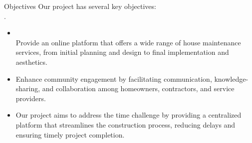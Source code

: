 \documentclass{beamer} %
\begin{document}
\begin{frame}{Objectives}
    Our project has several key objectives:\\.
     \begin{minipage}{1\textwidth}
            \begin{itemize}
                \item \\Provide an online platform that offers a wide range of house maintenance services, from initial planning and design to final implementation and aesthetics.

                

                \item Enhance community engagement by facilitating communication, knowledge-sharing, and collaboration among homeowners, contractors, and service providers.

                \item Our project aims to address the time challenge by providing a centralized platform that streamlines the construction process, reducing delays and ensuring timely project completion.
            \end{itemize}
        \end{minipage}
    
    
    \vspace{10pt} %
    \begin{figure}
        \hfill
    \end{figure}
\end{frame}

%       
  
\end{document}
